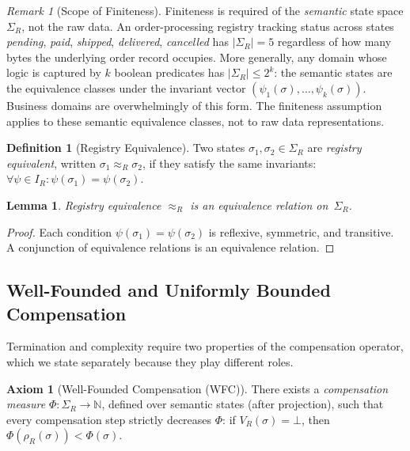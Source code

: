 \documentclass[11pt,a4paper]{article}
\theoremstyle{plain}
\newtheorem{lemma}[theorem]{Lemma}
\theoremstyle{definition}
\newtheorem{definition}[theorem]{Definition}
\newtheorem{axiom}[theorem]{Axiom}
\theoremstyle{remark}
\newtheorem{remark}[theorem]{Remark}
\renewcommand{\_}{\textunderscore\allowbreak}
\begin{document}
\begin{remark}[Scope of Finiteness]
\label{rem:scope}
Finiteness is required of the \emph{semantic} state space $\Sigma_R$, not the
raw data.  An order-processing registry tracking status across states
\emph{pending}, \emph{paid}, \emph{shipped}, \emph{delivered},
\emph{cancelled} has $|\Sigma_R| = 5$ regardless of how many bytes the
underlying order record occupies.  More generally, any domain whose logic is
captured by $k$ boolean predicates has $|\Sigma_R| \leq 2^k$: the semantic
states are the equivalence classes under the invariant vector
$(\psi_1(\sigma), \ldots, \psi_k(\sigma))$.  Business domains are
overwhelmingly of this form.  The finiteness assumption applies to these
semantic equivalence classes, not to raw data representations.
\end{remark}

\begin{definition}[Registry Equivalence]
\label{def:equiv}
Two states $\sigma_1, \sigma_2 \in \Sigma_R$ are \emph{registry equivalent},
written $\sigma_1 \approx_R \sigma_2$, if they satisfy the same invariants:
$\forall \psi \in I_R: \psi(\sigma_1) = \psi(\sigma_2)$.
\end{definition}

\begin{lemma}
\label{lem:equiv-relation}
Registry equivalence $\approx_R$ is an equivalence relation on~$\Sigma_R$.
\end{lemma}
\begin{proof}
Each condition $\psi(\sigma_1) = \psi(\sigma_2)$ is reflexive, symmetric, and
transitive.  A conjunction of equivalence relations is an equivalence relation.
\end{proof}

\subsection{Well-Founded and Uniformly Bounded Compensation}

Termination and complexity require two properties of the compensation
operator, which we state separately because they play different roles.

\begin{axiom}[Well-Founded Compensation (WFC)]
\label{ax:wfc}
There exists a \emph{compensation measure}
$\Phi: \Sigma_R \to \mathbb{N}$, defined over semantic states (after
projection), such that every compensation step strictly
decreases $\Phi$: if $V_R(\sigma) = \bot$, then
$\Phi(\rho_R(\sigma)) < \Phi(\sigma)$.
\end{axiom}
\end{document}
